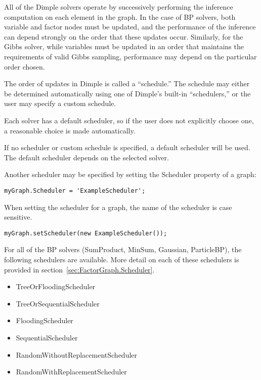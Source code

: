 All of the Dimple solvers operate by successively performing the inference computation on each element in the graph.  In the case of BP solvers, both variable and factor nodes must be updated, and the performance of the inference can depend strongly on the order that these updates occur.  Similarly, for the Gibbs solver, while variables must be updated in an order that maintains the requirements of valid Gibbs sampling, performance may depend on the particular order chosen.

The order of updates in Dimple is called a ``schedule.''  The schedule may either be determined automatically using one of Dimple's built-in ``schedulers,'' or the user may specify a custom schedule.

Each solver has a default scheduler, so if the user does not explicitly choose one, a reasonable choice is made automatically.



If no scheduler or custom schedule is specified, a default scheduler will be used.  The default scheduler depends on the selected solver.

Another scheduler may be specified by setting the Scheduler property of a graph:

\ifmatlab

\begin{lstlisting}
myGraph.Scheduler = 'ExampleScheduler';	
\end{lstlisting}

When setting the scheduler for a graph, the name of the scheduler is case sensitive.

\fi

\ifjava
\begin{lstlisting}
myGraph.setScheduler(new ExampleScheduler());
\end{lstlisting}
\fi

For all of the BP solvers (SumProduct, MinSum, Gaussian, ParticleBP), the following schedulers are available.  More detail on each of these schedulers is provided in section~\ref{sec:FactorGraph.Scheduler}.

\begin{itemize}
\item TreeOrFloodingScheduler
\item TreeOrSequentialScheduler
\item FloodingScheduler
\item SequentialScheduler
\item RandomWithoutReplacementScheduler
\item RandomWithReplacementScheduler
\end{itemize}

